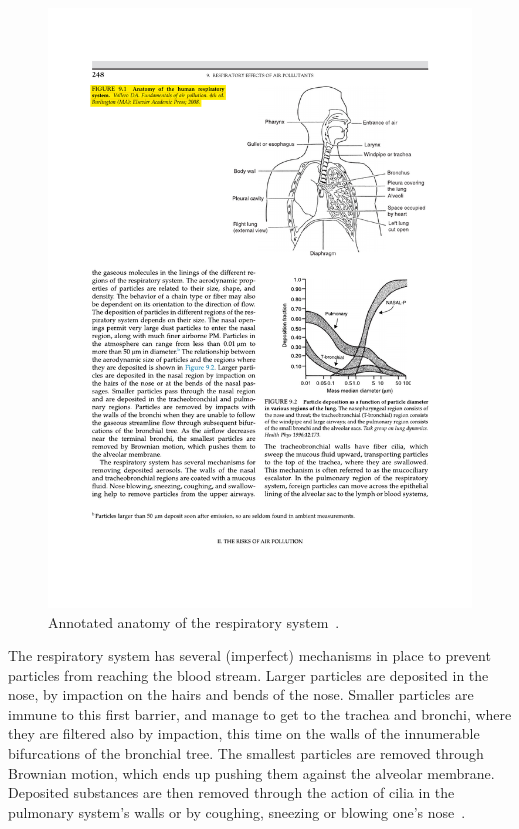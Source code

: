 \begin{figure}[htpb]
    \centering
    \includegraphics[clip,%
    trim=9.1cm 17cm 2.1cm 5cm,%
    width=.8\textwidth]{img/pdf/respiratory_system.pdf}
    \caption{Annotated anatomy of the respiratory
    system~\cite{Vallero2014}.}
    \label{fig:respiratory_system}
\end{figure}

The respiratory system has several (imperfect) mechanisms in place to
prevent particles from reaching the blood stream. Larger particles are
deposited in the nose, by impaction on the hairs and bends of the nose.
Smaller particles are immune to this first barrier, and manage to get to
the trachea and bronchi, where they are filtered also by impaction, this
time on the walls of the innumerable bifurcations of the bronchial tree.
The smallest particles are removed through Brownian motion, which ends
up pushing them against the alveolar membrane. Deposited substances are
then removed through the action of cilia in the pulmonary system's walls
or by coughing, sneezing or blowing one's nose~\cite{Vallero2014}.

